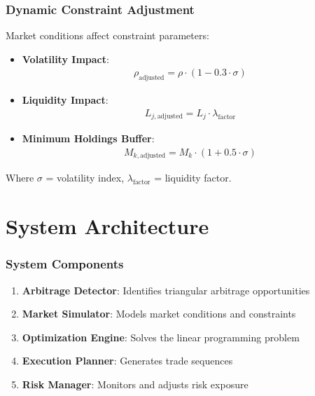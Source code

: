 \documentclass{beamer}
\begin{document}
\begin{frame}
\frametitle{Dynamic Constraint Adjustment}
Market conditions affect constraint parameters:

\begin{itemize}
    \item \textbf{Volatility Impact}: 
    \begin{align}
    \rho_{\text{adjusted}} = \rho \cdot (1 - 0.3 \cdot \sigma)
    \end{align}
    
    \item \textbf{Liquidity Impact}:
    \begin{align}
    L_{j,\text{adjusted}} = L_j \cdot \lambda_{\text{factor}}
    \end{align}
    
    \item \textbf{Minimum Holdings Buffer}:
    \begin{align}
    M_{k,\text{adjusted}} = M_k \cdot (1 + 0.5 \cdot \sigma)
    \end{align}
\end{itemize}

Where $\sigma$ = volatility index, $\lambda_{\text{factor}}$ = liquidity factor.
\end{frame}

\section{System Architecture}

\begin{frame}
\frametitle{System Components}
\begin{enumerate}
    \item \textbf{Arbitrage Detector}: Identifies triangular arbitrage opportunities
    \item \textbf{Market Simulator}: Models market conditions and constraints
    \item \textbf{Optimization Engine}: Solves the linear programming problem
    \item \textbf{Execution Planner}: Generates trade sequences
    \item \textbf{Risk Manager}: Monitors and adjusts risk exposure
\end{enumerate}

\vspace{0.5cm}

\end{frame}
\end{document}
